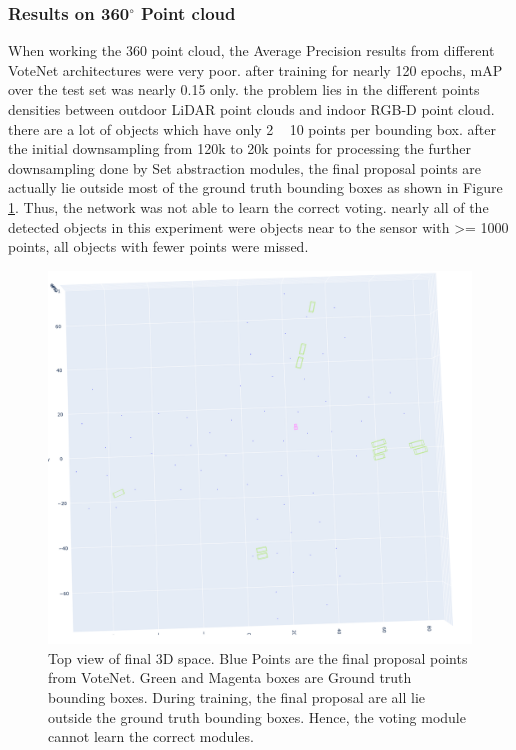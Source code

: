 \documentclass[10pt,twocolumn,letterpaper]{article}
\begin{document}
\subsubsection{Results on 360$^{\circ}$ Point cloud}
When working the 360 point cloud, the Average Precision results from different VoteNet architectures were very poor. after training for nearly 120 epochs, mAP over the test set was nearly 0.15 only. the problem lies in the different points densities between outdoor LiDAR point clouds and  indoor RGB-D point cloud. there are a lot of objects which have only 2 ~ 10 points per bounding box. after the initial downsampling from 120k to 20k points for processing the further downsampling done by Set abstraction modules, the final proposal points are actually lie outside most of the ground truth bounding boxes as shown in Figure \ref{fig:proposal_points}. Thus, the network was not able to learn the correct voting. nearly all of the detected objects in this experiment were objects near to the sensor with >= 1000 points, all objects with fewer points were missed.

\begin{figure}
	\includegraphics[width=\linewidth]{media/votenet_proposal_points.png}
   \caption{Top view of final 3D space. Blue Points are the final proposal points from VoteNet. Green and Magenta boxes are Ground truth bounding boxes. During training, the final proposal are all lie outside the ground truth bounding boxes. Hence, the voting module cannot learn the correct modules.}
\label{fig:proposal_points}
\end{figure}
\end{document}
